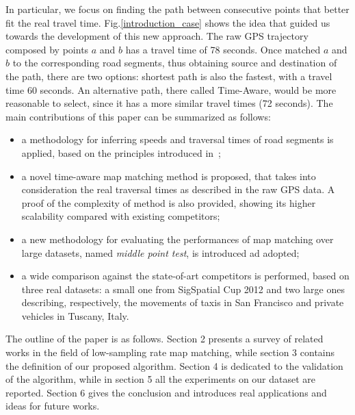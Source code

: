 \documentclass[5p]{elsarticle}
\begin{document}
In particular, we focus on finding the path between consecutive points that better fit 
the real travel time. 
Fig.\ref{introduction_case}
shows the idea that guided us towards the development of this new approach. The raw GPS trajectory composed by points $a$ and $b$ has a travel time of 78 seconds. Once
matched $a$ and $b$ to the corresponding road segments, thus obtaining source and destination of the path, there are two options: shortest path is also the fastest, with a travel time  60 
seconds. An alternative path, there called Time-Aware, would be more reasonable to select, since it has a more similar travel times (72 seconds). 
The main contributions of this paper can be summarized as follows:
\begin{itemize}
\item a methodology for inferring speeds and traversal times of road segments is applied, based on the principles introduced in~\cite{cintia2013gravity};
\item a novel time-aware map matching method is proposed, that takes into consideration the real traversal times as described in the raw GPS data. A proof of the complexity of method is also provided, showing its higher scalability compared with existing competitors;
\item a new methodology for evaluating the performances of map matching over large datasets, named {\em middle point test}, is introduced ad adopted;
\item a wide comparison against the state-of-art competitors is performed, based on three real datasets: a small one from SigSpatial Cup 2012 and two large ones describing, respectively, the movements of taxis in San Francisco and private vehicles in Tuscany, Italy.
\end{itemize}

The outline of the paper is as follows. Section 2 presents a survey of related works in the field of low-sampling rate map matching, while section 3 contains the definition
of our proposed algorithm. Section 4 is dedicated to the validation of the algorithm, while in section 5 all the experiments on our dataset are reported. Section 6 gives the conclusion and introduces real applications and ideas for future works. 
\end{document}
